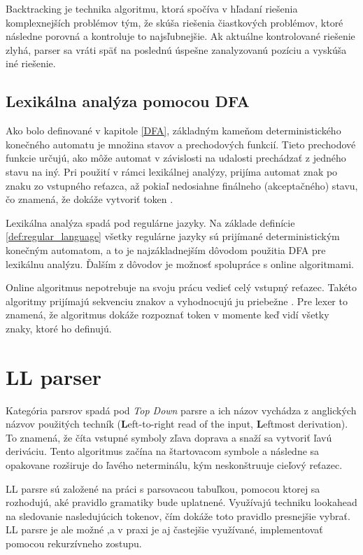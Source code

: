 Backtracking je technika algoritmu, ktorá spočíva v hľadaní riešenia komplexnejších problémov tým, že skúša riešenia čiastkových problémov, ktoré následne porovná a kontroluje to najsľubnejšie. Ak aktuálne kontrolované riešenie zlyhá, parser sa vráti späť na poslednú úspešne zanalyzovanú pozíciu a vyskúša iné riešenie.

\subsection{Lexikálna analýza pomocou DFA}
Ako bolo definované v kapitole \ref{DFA}, základným kameňom deterministického konečného automatu je množina stavov a prechodových funkcií. Tieto prechodové funkcie určujú, ako môže automat v závislosti na udalosti prechádzať z jedného stavu na iný. Pri použití v rámci lexikálnej analýzy, prijíma automat znak po znaku zo vstupného reťazca, až pokiaľ nedosiahne finálneho (akceptačného) stavu, čo znamená, že dokáže vytvoriť token \cite{roche1997finite}.

Lexikálna analýza spadá pod regulárne jazyky. Na základe definície \ref{def:regular_language} všetky regulárne jazyky sú prijímané deterministickým konečným automatom, a to je najzákladnejším dôvodom použitia DFA pre lexikálnu analýzu. Ďalším z dôvodov je možnosť spolupráce s online algoritmami.

Online algoritmus nepotrebuje na svoju prácu vedieť celý vstupný reťazec. Takéto algoritmy prijímajú sekvenciu znakov a vyhodnocujú ju priebežne \cite{karp1992line}. Pre lexer to znamená, že algoritmus dokáže rozpoznať token v momente keď vidí všetky znaky, ktoré ho definujú.

\section{LL parser}\label{LL}
Kategória  parsrov spadá pod \textit{Top Down} parsre a ich názov vychádza z anglických názvov použitých techník (\textbf{L}eft-to-right read of the input, \textbf{L}eftmost derivation). To znamená, že číta vstupné symboly zľava doprava a snaží sa vytvoriť ľavú deriváciu. Tento algoritmus začína na štartovacom symbole a následne sa opakovane rozširuje do ľavého neterminálu, kým neskonštruuje cieľový reťazec. 

LL parsre sú založené na práci s parsovacou tabuľkou, pomocou ktorej sa rozhodujú, aké pravidlo gramatiky bude uplatnené. Využívajú techniku lookahead na sledovanie nasledujúcich tokenov, čím dokáže toto pravidlo presnejšie vybrať. LL parsre je ale možné ,a v praxi je aj častejšie využívané, implementovať pomocou rekurzívneho zostupu.

